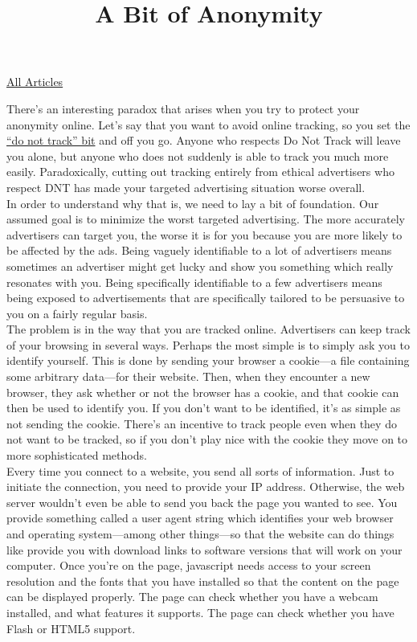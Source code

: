 \documentclass{article}
\title{A Bit of Anonymity}
\begin{document}
\maketitle
\begin{center}
  \href{../index.html}{All Articles}
\end{center}

There's an interesting paradox that arises when you try to protect your anonymity online. Let's say that you want to avoid online tracking, so you set the \href{https://www.eff.org/issues/do-not-track}{``do not track'' bit} and off you go. Anyone who respects Do Not Track will leave you alone, but anyone who does not suddenly is able to track you much more easily. Paradoxically, cutting out tracking entirely from ethical advertisers who respect DNT has made your targeted advertising situation worse overall.\\

In order to understand why that is, we need to lay a bit of foundation. Our assumed goal is to minimize the worst targeted advertising. The more accurately advertisers can target you, the worse it is for you because you are more likely to be affected by the ads. Being vaguely identifiable to a lot of advertisers means sometimes an advertiser might get lucky and show you something which really resonates with you. Being specifically identifiable to a few advertisers means being exposed to advertisements that are specifically tailored to be persuasive to you on a fairly regular basis.\\

The problem is in the way that you are tracked online. Advertisers can keep track of your browsing in several ways. Perhaps the most simple is to simply ask you to identify yourself. This is done by sending your browser a cookie---a file containing some arbitrary data---for their website. Then, when they encounter a new browser, they ask whether or not the browser has a cookie, and that cookie can then be used to identify you. If you don't want to be identified, it's as simple as not sending the cookie. There's an incentive to track people even when they do not want to be tracked, so if you don't play nice with the cookie they move on to more sophisticated methods.\\

Every time you connect to a website, you send all sorts of information. Just to initiate the connection, you need to provide your IP address. Otherwise, the web server wouldn't even be able to send you back the page you wanted to see. You provide something called a user agent string which identifies your web browser and operating system---among other things---so that the website can do things like provide you with download links to software versions that will work on your computer. Once you're on the page, javascript needs access to your screen resolution and the fonts that you have installed so that the content on the page can be displayed properly. The page can check whether you have a webcam installed, and what features it supports. The page can check whether you have Flash or HTML5 support.\\
\end{document}
